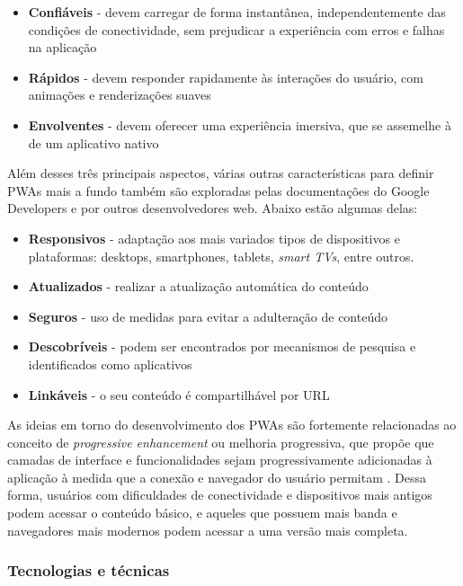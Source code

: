 \begin{itemize}
\item \textbf{Confiáveis} - devem carregar de forma instantânea, independentemente das condições de conectividade, sem prejudicar a experiência com erros e falhas na aplicação
\item \textbf{Rápidos} - devem responder rapidamente às interações do usuário, com animações e renderizações suaves
\item \textbf{Envolventes} - devem oferecer uma experiência imersiva, que se assemelhe à de um aplicativo nativo
\end{itemize}

Além desses três principais aspectos, várias outras características para definir PWAs mais a fundo também são exploradas pelas documentações do Google Developers \cite{googledevpwachecklist} e por outros desenvolvedores web. Abaixo estão algumas delas:

\begin{itemize}
\item \textbf{Responsivos} - adaptação aos mais variados tipos de dispositivos e plataformas: desktops, smartphones, tablets, \textit{smart TVs}, entre outros.
\item \textbf{Atualizados} - realizar a atualização automática do conteúdo
\item \textbf{Seguros} - uso de medidas para evitar a adulteração de conteúdo
\item \textbf{Descobríveis} - podem ser encontrados por mecanismos de pesquisa e identificados como aplicativos
\item \textbf{Linkáveis} - o seu conteúdo é compartilhável por URL
\end{itemize}

As ideias em torno do desenvolvimento dos PWAs são fortemente relacionadas ao conceito de \textit{progressive enhancement} ou melhoria progressiva, que propõe que camadas de interface e funcionalidades sejam progressivamente adicionadas à aplicação à medida que a conexão e navegador do usuário permitam \cite{champeon}. Dessa forma, usuários com dificuldades de conectividade e dispositivos mais antigos podem acessar o conteúdo básico, e aqueles que possuem mais banda e navegadores mais modernos podem acessar a uma versão mais completa.

\subsubsection{Tecnologias e técnicas}

